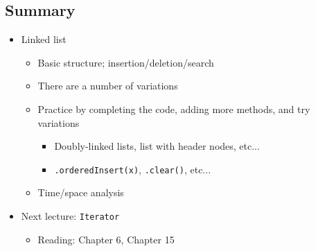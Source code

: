 \documentclass[10pt]{article}
\begin{document}
\subsection*{Summary}
\begin{itemize}
    \item Linked list
    \begin{itemize}
        \item Basic structure; insertion/deletion/search
        \item There are a number of variations
        \item Practice by completing the code, adding more methods, and try variations
        \begin{itemize}
            \item Doubly-linked lists, list with header nodes, etc...
            \item \texttt{.orderedInsert(x)}, \texttt{.clear()}, etc...
        \end{itemize}
        \item Time/space analysis
    \end{itemize}
    \item Next lecture: \texttt{Iterator}
    \begin{itemize}
        \item Reading: Chapter 6, Chapter 15
    \end{itemize}
\end{itemize}
\end{document}
